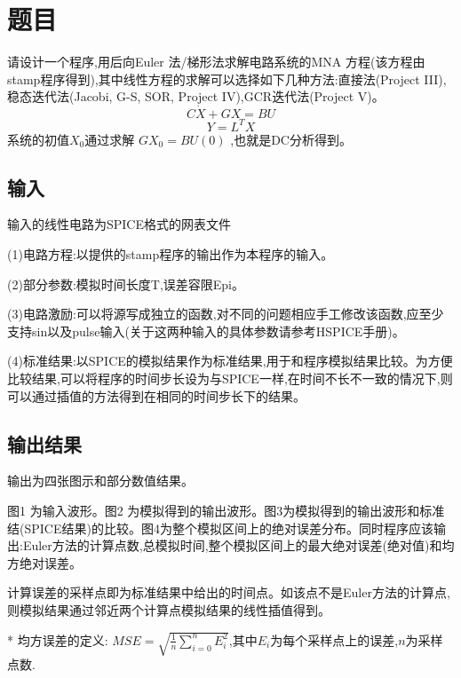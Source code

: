\documentclass[12pt]{article}
\begin{document}
\begin{sloppypar}
\begin{titlepage}
\begin{center}
\end{center}
\end{titlepage}




\section{题目}
\qquad 请设计一个程序,用后向Euler 法/梯形法求解电路系统的MNA 方程(该方程由stamp程序得到),其中线性方程的求解可以选择如下几种方法:直接法(Project III),稳态迭代法(Jacobi, G-S, SOR, Project IV),GCR迭代法(Project V)。
\begin{equation}
\label{MNA}
C \dot{X}+G X=B U
\end{equation}
\begin{equation}
Y=L^T X 
\end{equation}
系统的初值$X_0$通过求解 $GX_0 = BU(0)$ ,也就是DC分析得到。

\subsection{输入}
\qquad 输入的线性电路为SPICE格式的网表文件 \par
\qquad (1)电路方程:以提供的stamp程序的输出作为本程序的输入。 \par
\qquad (2)部分参数:模拟时间长度T,误差容限Epi。 \par
\qquad (3)电路激励:可以将源写成独立的函数,对不同的问题相应手工修改该函数,应至少支持sin以及pulse输入(关于这两种输入的具体参数请参考HSPICE手册)。 \par
\qquad (4)标准结果:以SPICE的模拟结果作为标准结果,用于和程序模拟结果比较。为方便比较结果,可以将程序的时间步长设为与SPICE一样,在时间不长不一致的情况下,则可以通过插值的方法得到在相同的时间步长下的结果。 \par

\subsection{输出结果}
\qquad 输出为四张图示和部分数值结果。 \par
\qquad 图1 为输入波形。图2 为模拟得到的输出波形。图3为模拟得到的输出波形和标准结(SPICE结果)的比较。图4为整个模拟区间上的绝对误差分布。同时程序应该输出:Euler方法的计算点数,总模拟时间,整个模拟区间上的最大绝对误差(绝对值)和均方绝对误差。 \par
\qquad * 计算误差的采样点即为标准结果中给出的时间点。如该点不是Euler方法的计算点,则模拟结果通过邻近两个计算点模拟结果的线性插值得到。 \par
\qquad ** 均方误差的定义: $MSE=\sqrt{\frac{1}{n}\sum_{i=0}^{n}E_i^2}$,其中$E_i$为每个采样点上的误差,$n$为采样点数. \par


\end{sloppypar}
\end{document}
